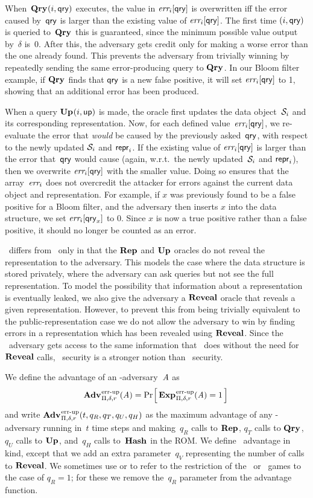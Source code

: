 When~$\textup{\textbf{Qry}}\hspace{0.5pt}(i,\mathsf{qry})$ executes, the value in $\textit{err}_i[\mathsf{qry}]$ is overwritten iff
the error caused by~$\mathsf{qry}$ is larger than the existing value of $\textit{err}_i[\mathsf{qry}]$.
The first time $(i,\mathsf{qry})$ is queried to~$\textup{\textbf{Qry}}\hspace{0.5pt}$ this is guaranteed, since the
minimum possible value output by~$\delta$ is~$0$. After this, the adversary gets
credit only for making a worse error than the one already found. This prevents
the adversary from trivially winning by repeatedly sending the same
error-producing query to $\textup{\textbf{Qry}}\hspace{0.5pt}$. In our Bloom filter example, if $\textup{\textbf{Qry}}\hspace{0.5pt}$ finds
that $\mathsf{qry}$ is a new false positive, it will set $\textit{err}_i[\mathsf{qry}]$ to 1, showing
that an additional error has been produced.

When a query $\textup{\textbf{Up}}\hspace{0.5pt}(i,\mathsf{up})$ is made, the oracle first updates the data
object~$\mathcal{S}_i$ and its corresponding representation.
%
Now, for each defined value~$\textit{err}_i[\mathsf{qry}]$, we re-evaluate the error that
\emph{would} be caused by the previously asked~$\mathsf{qry}$, with respect to the newly updated
$\mathcal{S}_i$ and $\mathsf{repr}_i$. If the existing value of $\textit{err}_i[\mathsf{qry}]$ is larger than
the error that~$\mathsf{qry}$ would cause (again, w.r.t.\ the newly updated~$\mathcal{S}_i$ and
$\mathsf{repr}_i$), then we overwrite $\textit{err}_i[\mathsf{qry}]$ with the smaller value.  Doing so
ensures that the array~$\textit{err}_i$ does not overcredit the attacker for errors
against the current data object and representation. For example, if $x$ was
previously found to be a false positive for a Bloom filter, and the adversary
then inserts $x$ into the data structure, we set $\textit{err}_i[\mathsf{qry}_x]$ to 0. Since
$x$ is now a true positive rather than a false positive, it should no longer
be counted as an error.

\erreps\ differs from \errep\ only in that the $\textup{\textbf{Rep}}\hspace{0.5pt}$ and $\textup{\textbf{Up}}\hspace{0.5pt}$ oracles do not
reveal the representation to the adversary. This models the case where the data
structure is stored privately, where the adversary can ask queries but not see
the full representation. To model the possibility that information about a
representation is eventually leaked, we also give the adversary a $\mathbf{Reveal}$ oracle
that reveals a given representation. However, to prevent this from being
trivially equivalent to the public-representation case we do not allow the
adversary to win by finding errors in a representation which has been revealed
using $\mathbf{Reveal}$. Since the \errep\ adversary gets access to the same information
that \erreps\ does without the need for $\mathbf{Reveal}$ calls, \errep\ security is a
stronger notion than \erreps\ security.

We define the advantage of an \errep-adversary~$\mathit{A}$ as
\[\Adv{\errep}_{\struct,\delta,r}(\advA) =
\Prob{\Exp{\errep}_{\struct,\delta,r}(\advA) = 1} \,\]
and write
$\Adv{\errep}_{\struct,\delta,r}(t,q_R,q_T,q_U,q_H)$ as the maximum advantage of
any \errep-adversary running in~$t$ time steps and making~$q_R$ calls to
$\textup{\textbf{Rep}}\hspace{0.5pt}$, $q_T$ calls to $\textup{\textbf{Qry}}\hspace{0.5pt}$, $q_U$ calls to $\textup{\textbf{Up}}\hspace{0.5pt}$, and~$q_H$ calls
to~$\textup{\textbf{Hash}}\hspace{0.5pt}$ in the ROM.
%
We define \erreps\ advantage in kind, except that
we add an extra parameter~$q_V$ representing the number of calls to $\mathbf{Reveal}$. We
sometimes use  or  to refer to the restriction of the \errep\ or
\erreps\ games to the case of $q_R = 1$; for these we remove the~$q_R$ parameter
from the advantage function.

